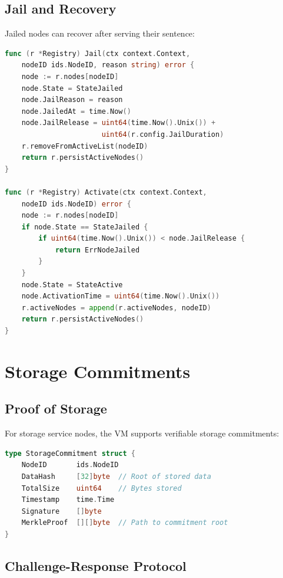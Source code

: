 \documentclass[11pt,a4paper]{article}
\begin{document}
\subsection{Jail and Recovery}

Jailed nodes can recover after serving their sentence:

\begin{lstlisting}[language=Go,caption={Jail and Unjail}]
func (r *Registry) Jail(ctx context.Context,
    nodeID ids.NodeID, reason string) error {
    node := r.nodes[nodeID]
    node.State = StateJailed
    node.JailReason = reason
    node.JailedAt = time.Now()
    node.JailRelease = uint64(time.Now().Unix()) +
                       uint64(r.config.JailDuration)
    r.removeFromActiveList(nodeID)
    return r.persistActiveNodes()
}

func (r *Registry) Activate(ctx context.Context,
    nodeID ids.NodeID) error {
    node := r.nodes[nodeID]
    if node.State == StateJailed {
        if uint64(time.Now().Unix()) < node.JailRelease {
            return ErrNodeJailed
        }
    }
    node.State = StateActive
    node.ActivationTime = uint64(time.Now().Unix())
    r.activeNodes = append(r.activeNodes, nodeID)
    return r.persistActiveNodes()
}
\end{lstlisting}

\section{Storage Commitments}

\subsection{Proof of Storage}

For storage service nodes, the VM supports verifiable storage commitments:

\begin{lstlisting}[language=Go,caption={Storage Commitment}]
type StorageCommitment struct {
    NodeID       ids.NodeID
    DataHash     [32]byte  // Root of stored data
    TotalSize    uint64    // Bytes stored
    Timestamp    time.Time
    Signature    []byte
    MerkleProof  [][]byte  // Path to commitment root
}
\end{lstlisting}

\subsection{Challenge-Response Protocol}
\end{document}
